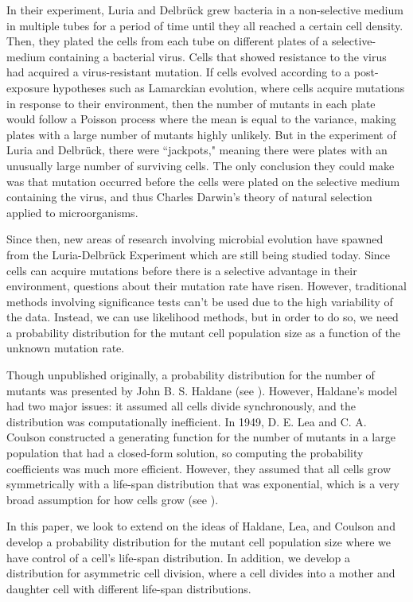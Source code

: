 \documentclass[12pt]{amsart}
\theoremstyle{plain}
\theoremstyle{definition}
\theoremstyle{remark}
\theoremstyle{definition}
\begin{document}
In their experiment, Luria and Delbr\"uck grew bacteria in a non-selective medium in multiple tubes for a period of time until they all reached a certain cell density. Then, they plated the cells from each tube on different plates of a selective-medium containing a bacterial virus. Cells that showed resistance to the virus had acquired a virus-resistant mutation. If cells evolved according to a post-exposure hypotheses such as Lamarckian evolution, where cells acquire mutations in response to their environment, then the number of mutants in each plate would follow a Poisson process where the mean is equal to the variance, making plates with a large number of mutants highly unlikely. But in the experiment of Luria and Delbr\"uck, there were ``jackpots," meaning there were plates with an unusually large number of surviving cells. The only conclusion they could make was that mutation occurred before the cells were plated on the selective medium containing the virus, and thus Charles Darwin's theory of natural selection applied to microorganisms.

Since then, new areas of research involving microbial evolution have spawned from the Luria-Delbr\"uck Experiment which are still being studied today. Since cells can acquire mutations before there is a selective advantage in their environment, questions about their mutation rate have risen. However, traditional methods involving significance tests can't be used due to the high variability of the data. Instead, we can use likelihood methods, but in order to do so, we need a probability distribution for the mutant cell population size as a function of the unknown mutation rate.

Though unpublished originally, a probability distribution for the number of mutants was presented by John B. S. Haldane (see \cite{sarkarHaldane}). However, Haldane's model had two major issues: it assumed all cells divide synchronously, and the distribution was computationally inefficient. In 1949, D. E. Lea and C. A. Coulson constructed a generating function for the number of mutants in a large population that had a closed-form solution, so computing the probability coefficients was much more efficient. However, they assumed that all cells grow symmetrically with a life-span distribution that was exponential, which is a very broad assumption for how cells grow (see \cite{leaCoulson}).

In this paper, we look to extend on the ideas of Haldane, Lea, and Coulson and develop a probability distribution for the mutant cell population size where we have control of a cell's life-span distribution. In addition, we develop a distribution for asymmetric cell division, where a cell divides into a mother and daughter cell with different life-span distributions.
\end{document}
